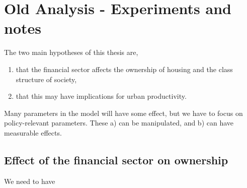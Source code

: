 \chapter{Old Analysis - Experiments and notes}
The two main hypotheses of this thesis are, 
\begin{enumerate}
 \item that the financial sector affects the ownership of housing and the class structure of society, 
    \item that this may have implications for urban productivity. 
\end{enumerate} 
Many parameters in the model will have some effect, but we have to focus on policy-relevant parameters. These a) can be manipulated, and b) can have measurable effects.


\section{Effect of the financial sector on ownership} 
We need to have 

